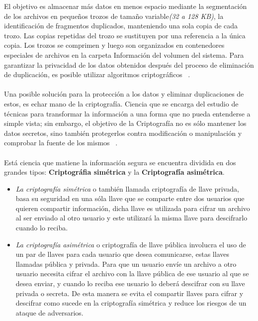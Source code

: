 El objetivo es almacenar más datos en menos espacio mediante la segmentación de los archivos en pequeños trozos de tamaño variable\textit{(32 a 128 KB)}, la identificación de fragmentos duplicados, manteniendo una sola copia de cada trozo. Las copias repetidas del trozo se sustituyen por una referencia a la única copia. Los trozos se comprimen y luego son organizados en contenedores especiales de archivos en la carpeta Información del volumen del sistema. Para garantizar la privacidad de los datos obtenidos después del proceso de eliminación de duplicación, es posible utilizar algoritmos criptográficos ~\cite{microsoft}.
\\ \\ 
Una posible solución para la protección a los datos y eliminar duplicaciones de estos, es echar mano de la criptografía. Ciencia que se encarga del estudio de técnicas para transformar la información a una forma que no pueda entenderse a simple vista; sin embargo, el objetivo de la Criptografía no es sólo mantener los datos secretos, sino también protegerlos contra modificación o manipulación y comprobar la fuente de los mismos ~\cite{fundamentos}. 
\\  \\
Está ciencia que matiene la información segura se encuentra dividida en dos grandes tipos: \textbf{Criptográfia simétrica} y la \textbf{Criptografía asimétrica}.  

\begin{itemize} 
   \item \textit{La criptografía simétrica} o también llamada criptografía de llave privada, basa su seguridad en una sóla llave que se comparte entre dos usuarios que quieren compartir información, dicha llave es utilizada para cifrar un archivo al ser enviado al otro usuario y este utilizará la misma llave para descifrarlo cuando lo reciba. 
\item \textit{La criptografía asimétrica} o criptografía de llave pública involucra el uso de un par de llaves para cada usuario que desea comunicarse, estas llaves llamadas pública y privada. Para que un usuario envíe un archivo a otro usuario necesita cifrar el archivo con la llave pública de ese usuario al que se desea enviar, y cuando lo reciba ese usuario lo deberá descifrar con su llave privada o secreta. De esta manera se evita el compartir llaves para cifrar y descifrar como sucede en la criptografía simétrica y reduce los riesgos de un ataque de adversarios. 
 \end{itemize}

